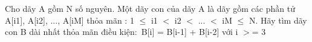 Cho dãy A gồm N số nguyên. Một dãy con của dãy A là dãy gồm các phần tử A[i1], A[i2], ..., A[iM] thỏa mãn : 1  $\le$  i1 $<$ i2 $<$ ... $<$ iM  $\le$  N. Hãy tìm dãy con B dài nhất thỏa mãn điều kiện: B[i] = B[i-1] + B[i-2] với i $>$= 3

\